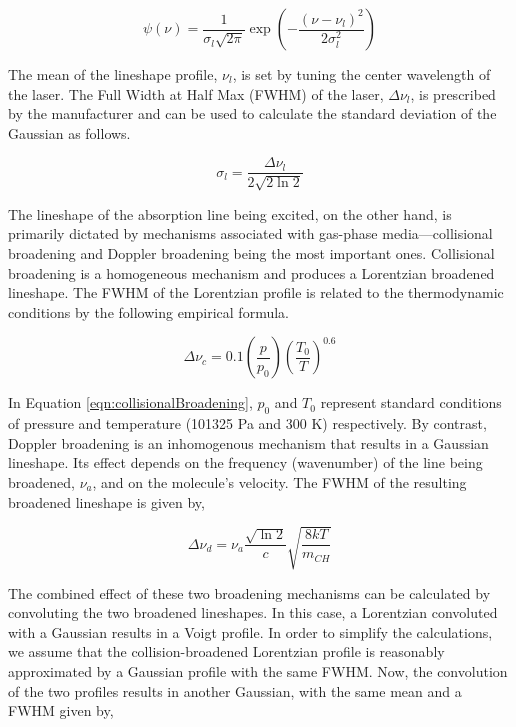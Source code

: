\begin{equation}
  \psi(\nu) = \frac{1}{\sigma_l\sqrt{2\pi}} \exp{\left(-\dfrac{(\nu-\nu_l)^2}{2\sigma_l^2}\right)}
  \label{eqn:laserLineShape}
\end{equation}

The mean of the lineshape profile, \(\nu_l\), is set by tuning the center wavelength of the laser.
The Full Width at Half Max (FWHM) of the laser, \(\Delta\nu_l\), is prescribed by the manufacturer and can be used to calculate the standard deviation of the Gaussian as follows.

\begin{equation}
  \sigma_l = \frac{\Delta\nu_l}{2 \sqrt{ 2 \ln{2} } }
\end{equation}

The lineshape of the absorption line being excited, on the other hand, is primarily dictated by mechanisms associated with gas-phase media---collisional broadening and Doppler broadening being the most important ones.
Collisional broadening is a homogeneous mechanism and produces a Lorentzian broadened lineshape.
The FWHM of the Lorentzian profile is related to the thermodynamic conditions by the following empirical formula.

\begin{equation}
  \Delta\nu_c = 0.1 \left(\frac{p}{p_0}\right) \left(\frac{T_0}{T}\right)^{0.6}
  \label{eqn:collisionalBroadening}
\end{equation}

In Equation \ref{eqn:collisionalBroadening}, \(p_0\) and \(T_0\) represent standard conditions of pressure and temperature (101325 Pa and 300 K) respectively.
By contrast, Doppler broadening is an inhomogenous mechanism that results in a Gaussian lineshape.
Its effect depends on the frequency (wavenumber) of the line being broadened, \(\nu_a\), and on the molecule's velocity.
The FWHM of the resulting broadened lineshape is given by,

\begin{equation}
  \Delta\nu_d = \nu_a \frac{\sqrt{ \ln 2 } }{c} \sqrt{\frac{8kT}{m_{CH}}}
  \label{eqn:dopplerBroadening}
\end{equation}

The combined effect of these two broadening mechanisms can be calculated by convoluting the two broadened lineshapes.
In this case, a Lorentzian convoluted with a Gaussian results in a Voigt profile.
In order to simplify the calculations, we assume that the collision-broadened Lorentzian profile is reasonably approximated by a Gaussian profile with the same FWHM.
Now, the convolution of the two profiles results in another Gaussian, with the same mean and a FWHM given by,

